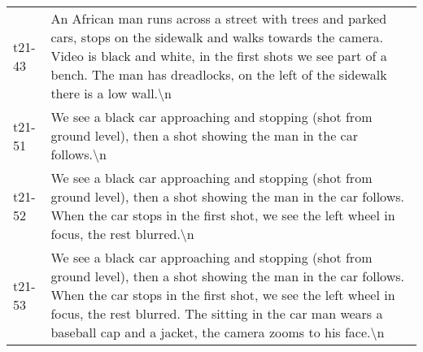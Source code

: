 \begin{tabular}{ll}
t21-43 &                                          An African man runs across a street with trees and parked cars, stops on the sidewalk and walks towards the camera. Video is black and white, in the first shots we see part of a bench. The man has dreadlocks, on the left of the sidewalk there is a low wall.\textbackslash n \\
t21-51 &                                                                                                                                                                                      We see a black car approaching and stopping (shot from ground level), then a shot showing the man in the car follows.\textbackslash n \\
t21-52 &                                                                                              We see a black car approaching and stopping (shot from ground level), then a shot showing the man in the car follows. When the car stops in the first shot, we see the left wheel in focus, the rest blurred.\textbackslash n \\
t21-53 &  We see a black car approaching and stopping (shot from ground level), then a shot showing the man in the car follows. When the car stops in the first shot, we see the left wheel in focus, the rest blurred. The sitting in the car man wears a baseball cap and a jacket, the camera zooms to his face.\textbackslash n \\
\bottomrule
\end{tabular}
